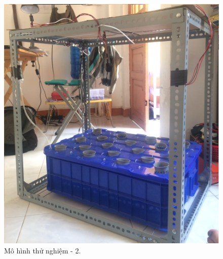 \documentclass[a4paper,12pt,oneside]{article}
\begin{document}
\begin{enumerate}
			\begin{figure}[H]
			\centering
			\includegraphics[scale=.125]{hinh/mohinh_2.jpg}
			\caption{Mô hình thử nghiệm - 2.}
			\end{figure}
			

\end{enumerate}
\end{document}
